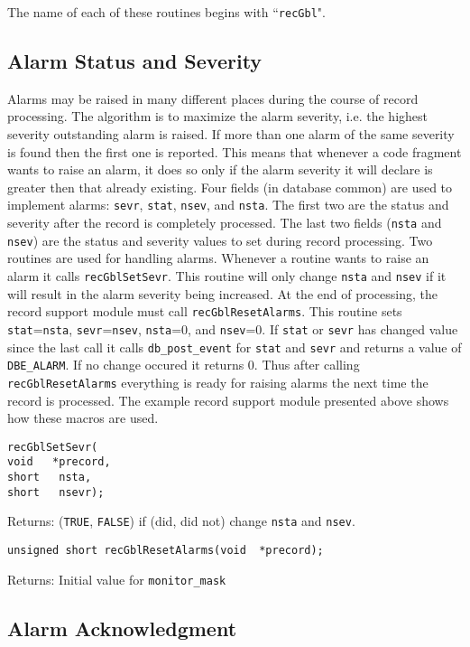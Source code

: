 The name of each of these routines begins with ``\verb|recGbl|".

\subsection{Alarm Status and Severity}

Alarms may be raised in many different places during the course of record processing. The algorithm is to maximize the 
alarm severity, i.e. the highest severity outstanding alarm is raised. If more than one alarm of the same severity is found 
then the first one is reported. This means that whenever a code fragment wants to raise an alarm, it does so only if the 
alarm severity it will declare is greater then that already existing. Four fields (in database common) are used to implement 
alarms: \verb|sevr|, \verb|stat|, \verb|nsev|, and \verb|nsta|. The first two are the status and severity after the record is completely processed. 
The last two fields (\verb|nsta| and \verb|nsev|) are the status and severity values to set during record processing. Two routines are 
used for handling alarms. Whenever a routine wants to raise an alarm it calls \verb|recGblSetSevr|. This routine will only 
change \verb|nsta| and \verb|nsev| if it will result in the alarm severity being increased. At the end of processing, the record support 
module must call \verb|recGblResetAlarms|. This routine sets \verb|stat|=\verb|nsta|, \verb|sevr|=\verb|nsev|, \verb|nsta|=0, and \verb|nsev|=0. If \verb|stat| 
or \verb|sevr| has changed value since the last call it calls \verb|db_post_event| for \verb|stat| and \verb|sevr| and returns a value of 
\verb|DBE_ALARM|. If no change occured it returns 0. Thus after calling \verb|recGblResetAlarms| everything is ready for raising 
alarms the next time the record is processed. The example record support module presented above shows how these 
macros are used.

\begin{verbatim}recGblSetSevr(
void   *precord,
short   nsta,
short   nsevr);
\end{verbatim}Returns: (\verb|TRUE|, \verb|FALSE|) if (did, did not) change \verb|nsta| and \verb|nsev|.

\begin{verbatim}unsigned short recGblResetAlarms(void  *precord);
\end{verbatim}Returns: Initial value for \verb|monitor_mask|

\subsection{Alarm Acknowledgment}

